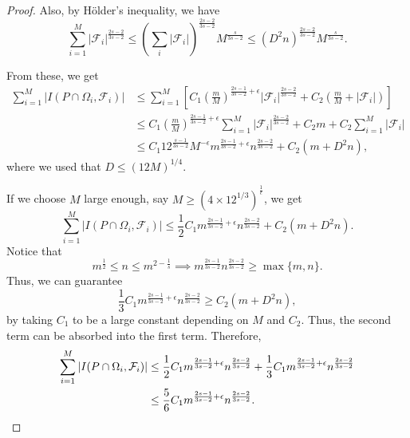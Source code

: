 \documentclass[11pt]{article}
\theoremstyle{definition}
\begin{document}
\begin{proof}
Also, by H\"older's inequality, we have
\begin{equation*}
    \sum_{i=1}^{M} |\mathcal{F}_i|^{\frac{2s-2}{3s-2}} \leq \left( \sum_{i} |\mathcal{F}_i| \right)^{\frac{2s-2}{3s-2}} M^{\frac{s}{3s-2}} \leq \left( D^2 n \right)^{\frac{2s-2}{3s-2}} M^{\frac{s}{3s-2}}.
\end{equation*}

From these, we get
\begin{align*}
    \sum_{i=1}^{M} |I(P \cap \Omega_i,\mathcal{F}_i)|
    &\leq \sum_{i=1}^{M} \left[ C_1 \left( \frac{m}{M} \right) ^{\frac{2s-1}{3s-2}+\epsilon} |\mathcal{F}_i|^{\frac{2s-2}{3s-2}} + C_2 \left( \frac{m}{M} + |\mathcal{F}_i| \right) \right]\\
    &\leq C_1 \left( \frac{m}{M} \right) ^{\frac{2s-1}{3s-2}+\epsilon} \sum_{i=1}^{M} |\mathcal{F}_i|^{\frac{2s-2}{3s-2}} + C_2 m + C_2 \sum_{i=1}^{M} |\mathcal{F}_i|\\
    &\leq C_1 12^{\frac{s-1}{3s-2}} M^{-\epsilon} m^{\frac{2s-1}{3s-2}+\epsilon} n^{\frac{2s-2}{3s-2}} + C_2 \left( m + D^2n \right),
\end{align*} where we used that $D \leq (12M)^{1/4}$.

If we choose $M$ large enough, say $M \geq (4 \times 12^{1/3})^\frac{1}{\epsilon}$, we get
\begin{equation*}
    \sum_{i=1}^{M} |I(P \cap \Omega_i,\mathcal{F}_i)| \leq \frac{1}{2} C_1 m^{\frac{2s-1}{3s-2}+\epsilon} n^{\frac{2s-2}{3s-2}} + C_2 \left( m + D^2n \right).
\end{equation*}
Notice that
\begin{equation*}
   m^{\frac{1}{2}}\leq n \leq m^{2-\frac{1}{s}} \implies m^{\frac{2s-1}{3s-2}} n^{\frac{2s-2}{3s-2}} \geq \max\{m,n\}.
\end{equation*}
Thus, we can guarantee
\begin{equation*}
\frac{1}{3}C_1 m^{\frac{2s-1}{3s-2}+\epsilon} n^{\frac{2s-2}{3s-2}} \geq C_2 (m+D^2n),
\end{equation*} by taking $C_1$ to be a large constant depending on $M$ and $C_2$. Thus, the second term can be absorbed into the first term. Therefore,
\begin{align}
    \notag \sum_{i=1}^{M} |I(P \cap \Omega_i,\mathcal{F}_i)|
    &\leq \frac{1}{2} C_1 m^{\frac{2s-1}{3s-2}+\epsilon} n^{\frac{2s-2}{3s-2}} + \frac{1}{3}C_1 m^{\frac{2s-1}{3s-2}+\epsilon} n^{\frac{2s-2}{3s-2}}\\
    &\leq \frac{5}{6} C_1 m^{\frac{2s-1}{3s-2}+\epsilon} n^{\frac{2s-2}{3s-2}}. \label{eq:offvariety}
\end{align}


\end{proof}
\end{document}
